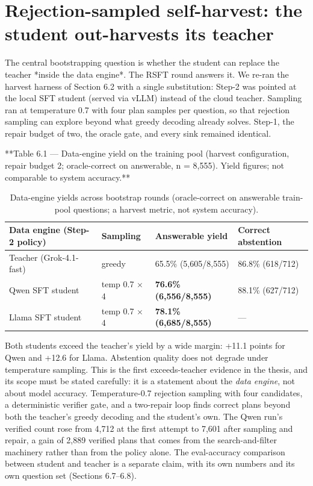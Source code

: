 \section{Rejection-sampled self-harvest: the student out-harvests its teacher}\label{sec:rejection-sampled-self-harvest-the-stude}

The central bootstrapping question is whether the student can replace the teacher *inside the
data engine*. The RSFT round answers it. We re-ran the harvest harness of Section 6.2 with a
single substitution: Step-2 was pointed at the local SFT student (served via vLLM) instead of
the cloud teacher. Sampling ran at temperature 0.7 with four plan samples per question, so
that rejection sampling can explore beyond what greedy decoding already solves. Step-1, the repair
budget of two, the oracle gate, and every sink remained identical.

**Table 6.1 --- Data-engine yield on the training pool (harvest configuration, repair budget 2;
oracle-correct on answerable, n = 8,555). Yield figures; not comparable to system accuracy.**

\begin{table}[t]
\centering
\small
\caption{Data-engine yields across bootstrap rounds (oracle-correct on answerable train-pool questions; a harvest metric, not system accuracy).}
\label{tab:06_experiments_1}
\begin{tabular}{llll}
\toprule
Data engine (Step-2 policy) & Sampling & Answerable yield & Correct abstention \\
\midrule
Teacher (Grok-4.1-fast) & greedy & 65.5\% (5,605/8,555) & 86.8\% (618/712) \\
Qwen SFT student & temp 0.7 $\times$ 4 & \textbf{76.6\% (6,556/8,555)} & 88.1\% (627/712) \\
Llama SFT student & temp 0.7 $\times$ 4 & \textbf{78.1\% (6,685/8,555)} & --- \\
\bottomrule
\end{tabular}
\end{table}


Both students exceed the teacher's yield by a wide margin: +11.1 points for Qwen and +12.6 for
Llama. Abstention quality does not degrade under temperature sampling. This is the first
exceeds-teacher evidence in the thesis, and its scope must be stated carefully: it is a
statement about the \emph{data engine}, not about model accuracy. Temperature-0.7 rejection
sampling with four candidates, a deterministic verifier gate, and a two-repair loop finds
correct plans beyond both the teacher's greedy decoding and the student's own. The Qwen run's
verified count rose from 4,712 at the first attempt to 7,601 after sampling and repair, a gain
of 2,889 verified plans that comes from the search-and-filter machinery rather than from the
policy alone. The eval-accuracy comparison between student and teacher is a separate claim,
with its own numbers and its own question set (Sections 6.7--6.8).


